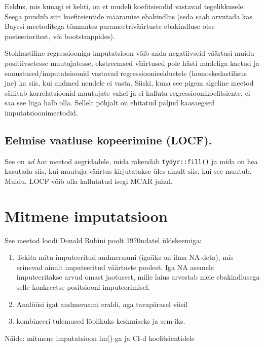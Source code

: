 \documentclass[]{book}
\begin{document}
Eeldus, mis kunagi ei kehti, on et mudeli koefitsiendid vastavad tegelikkusele. Seega puudub siin koefitsientide määramise ebakindlus (seda saab arvutada kas Bayesi meetoditega tõmmates parameetriväärtuste ebakindluse otse posteerioritest, või bootstrappides).

Stohhastiline regressiooniga imputatsioon võib anda negatiivseid väärtusi muidu positiivsetesse muutujatesse, ekstreemsed väärtused pole hästi mudeliga kaetud ja ennustused/imputatsioonid vastavad regressioonieeldustele (homoskedastilisus jne) ka siis, kui andmed nendele ei vasta. Siiski, kuna see pigem algeline meetod säilitab korrelatsioonid muutujate vahel ja ei kalluta regressioonikoefitsiente, ei saa see liiga halb olla. Sellelt põhjalt on ehitatud paljud kaasaegsed imputatsioonimeetodid.

\hypertarget{eelmise-vaatluse-kopeerimine-locf.}{%
\subsection{Eelmise vaatluse kopeerimine (LOCF).}\label{eelmise-vaatluse-kopeerimine-locf.}}

See on \emph{ad hoc} meetod aegridadele, mida rakendab \texttt{tydyr::fill()} ja mida on hea kasutada siis, kui muutuja väärtus kirjutatakse üles ainult siis, kui see muutub. Muidu, LOCF võib olla kallutatud isegi MCAR juhul.

\hypertarget{mitmene-imputatsioon}{%
\section{Mitmene imputatsioon}\label{mitmene-imputatsioon}}

See meetod loodi Donald Rubini poolt 1970ndatel üldskeemiga:

\begin{enumerate}
\def\labelenumi{\arabic{enumi}.}
\item
  Tekita mitu imputeeritud andmeraami (igaüks on ilma NA-deta), mis erinevad ainult imputeeritud väärtuste poolest. Iga NA asemele imputeeritakse arvud omast jaotusest, mille laius arvestab meie ebakindlusega selle konkreetse positsiooni imputeerimisel.
\item
  Analüüsi igat andmeraami eraldi, aga tavapärasel viisil
\item
  kombineeri tulemused lõplikuks keskmiseks ja sem-iks.
\end{enumerate}

Näide: mitmene imputatsioon lm()-ga ja CI-d koefitsientidele
\end{document}

